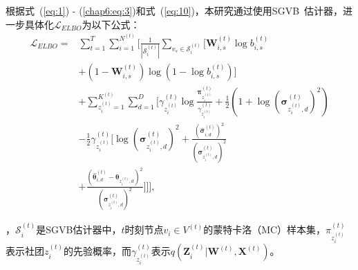 根据式~(\ref{eq:1}) - (\ref{chap6:eq:3})和式~(\ref{eq:10})，本研究通过使用SGVB~\cite{jiang2024incomplete}估计器，进一步具体化$\mathcal{L}_{ELBO}$为以下公式：
\begin{align} 
{\mathcal{L}_{ELBO}}  = &\sum_{t=1}^T \sum_{i=1}^{N^{(t)}}\Bigg[ \frac{1}{|\mathcal{S}_i^{(t)}|} \sum_{v_s\in \mathcal{S}_i^{(t)}} \Big[ \mathbf{W}_{i,s}^{(t)}\log{b_{i,s}^{(t)}} \nonumber\\
& + (1-\mathbf{W}_{i,s}^{(t)}) \log(1-\log{b_{i,s}^{(t)}}) \Big]\nonumber \\
&  + \sum_{z_i^{(t)}=1}^{K^{(t)}} \sum_{d=1}^{D}\Big[ \gamma_{z_i^{(t)}}^{(t)} \log\frac{\bm{\pi}_{z_i^{(t)}}^{(t)}}{\gamma_{z_i^{(t)}}^{(t)}} + \frac{1}{2} (1 + \log(\bm{\sigma}_{z_i^{(t)},d}^{(t)})^2) \nonumber\\
& - \frac{1}{2} \gamma_{z_i^{(t)}}^{(t)} \big[\log{(\bm{\sigma}_{z_i^{(t)},d}^{(t)})^2} + \frac{(\hat{\bm{\sigma}}_{i,d}^{(t)})^2}{(\bm{\sigma}_{z_i^{(t)},d}^{(t)})^2} \nonumber\\
& + \frac{({\hat{\bm{\theta}}}_{i,d}^{(t)} - \bm{\theta}_{z_i^{(t)},d})^{2}}{(\bm{\sigma}_{z_i^{(t)},d}^{(t)})^2}\big]\Big] \Bigg], 
\label{eq:16}
\end{align}

，$\mathcal{S}_i^{(t)}$是SGVB估计器中，$t$时刻节点$v_i \in V^{(t)}$的蒙特卡洛（MC）样本集，$\pi_{z_i^{(t)}}^{(t)}$表示社团$z_i^{(t)}$的先验概率，而$\gamma_{z_i^{(t)}}^{(t)}$表示$q(\mathbf{Z}_i^{(t)}|\mathbf{W}^{(t)},\mathbf{X}^{(t)})$。



